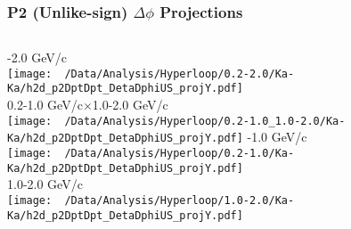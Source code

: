 \documentclass{beamer}
\begin{document}
\begin{frame}
	\frametitle{P2 (Unlike-sign) $\Delta\phi$ Projections}
	\begin{columns}
		-2.0 GeV/c\\
		\texttt{[image: ~/Data/Analysis/Hyperloop/0.2-2.0/Ka-Ka/h2d\_p2DptDpt\_DetaDphiUS\_projY.pdf]}\\0.2-1.0 GeV/c$\times$1.0-2.0 GeV/c\\
		\texttt{[image: ~/Data/Analysis/Hyperloop/0.2-1.0\_1.0-2.0/Ka-Ka/h2d\_p2DptDpt\_DetaDphiUS\_projY.pdf]}
		-1.0 GeV/c\\
		\texttt{[image: ~/Data/Analysis/Hyperloop/0.2-1.0/Ka-Ka/h2d\_p2DptDpt\_DetaDphiUS\_projY.pdf]}\\1.0-2.0 GeV/c\\
		\texttt{[image: ~/Data/Analysis/Hyperloop/1.0-2.0/Ka-Ka/h2d\_p2DptDpt\_DetaDphiUS\_projY.pdf]}
	\end{columns}
\end{frame}
\end{document}
